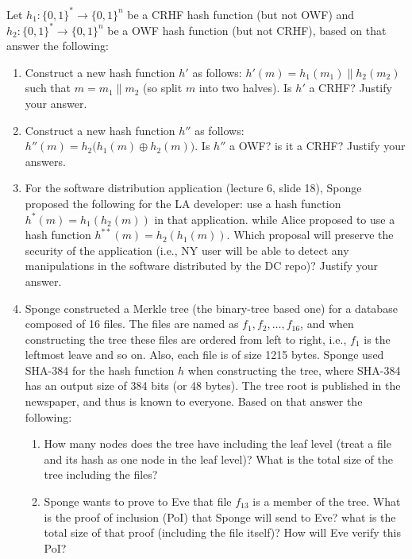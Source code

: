 \documentclass[12pt]{article}
\newcommand{\zo}{\{0,1\}}
\newcommand*\concat{\mathbin{\|}}
\newcommand\xor{\oplus}
\begin{document}
Let $h_1:\zo^{*} \to \zo^{n}$ be a CRHF hash function (but not OWF) and $h_2: \zo^{*} \to \zo^{n}$ be a OWF hash function (but not CRHF), based on that answer the following: 
\begin{enumerate}
    \item Construct a new hash function $h'$ as follows: $h'(m) = h_1(m_1) \concat h_2(m_2)$ such that $m = m_1 \concat m_2$ (so split $m$ into two halves). Is $h'$ a CRHF? Justify your answer.
    
    \item Construct a new hash function $h''$ as follows: $h''(m) =h_2\big(h_1(m) \xor h_2(m)\big)$. Is $h''$ a OWF? is it a CRHF? Justify your answers.
    
    \item For the software distribution application (lecture 6, slide 18), Sponge proposed the following for the LA developer: use a hash function $h^*(m) = h_1(h_2(m))$ in that application. while Alice proposed to use a hash function $h^{**}(m) = h_2(h_1(m))$. Which proposal will preserve the security of the application (i.e., NY user will be able to detect any manipulations in the software distributed by the DC repo)? Justify your answer.

    \item Sponge constructed a Merkle tree (the binary-tree based one) for a database composed of 16 files. The files are named as $f_1, f_2, \dots, f_{16}$, and when constructing the tree these files are ordered from left to right, i.e., $f_1$ is the leftmost leave and so on. Also, each file is of size 1215 bytes. Sponge used SHA-384 for the hash function $h$ when constructing the tree, where SHA-384 has an output size of 384 bits (or 48 bytes). The tree root is published in the newspaper, and thus is known to everyone. Based on that answer the following:
\begin{enumerate}
    \item How many nodes does the tree have including the leaf level (treat a file and its hash as one node in the leaf level)? What is the total size of the tree including the files?
    
    \item Sponge wants to prove to Eve that file $f_{13}$ is a member of the tree. What is the proof of inclusion (PoI) that Sponge will send to Eve? what is the total size of that proof (including the file itself)? How will Eve verify this PoI?
\end{enumerate}
\end{enumerate}
\end{document}
